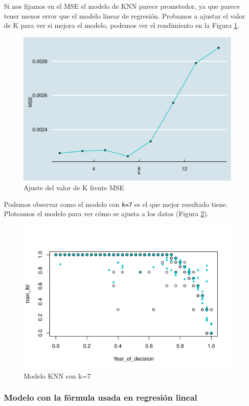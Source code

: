 \documentclass[
]{article}
\begin{document}
Si nos fijamos en el MSE el modelo de KNN parece prometedor, ya que
parece tener menos error que el modelo linear de regresión. Probamos a
ajustar el valor de K para ver si mejora el modelo, podemos ver el
rendimiento en la Figura \ref{fig:k_mse}.

\begin{figure}

{\centering \includegraphics[width=0.5\linewidth]{anacalt-regresion_files/figure-latex/k_mse-1} 

}

\caption{Ajuste del valor de K frente MSE}\label{fig:k_mse}
\end{figure}

Podemos observar como el modelo con \texttt{k=7} es el que mejor
resultado tiene. Ploteamos el modelo para ver cómo se ajusta a los datos
(Figura \ref{fig:model_knn}).

\begin{figure}

{\centering \includegraphics[width=0.5\linewidth]{anacalt-regresion_files/figure-latex/model_knn-1} 

}

\caption{Modelo KNN con k=7}\label{fig:model_knn}
\end{figure}

\hypertarget{modelo-con-la-fuxf3rmula-usada-en-regresiuxf3n-lineal}{%
\subsubsection{Modelo con la fórmula usada en regresión
lineal}\label{modelo-con-la-fuxf3rmula-usada-en-regresiuxf3n-lineal}}
\end{document}
